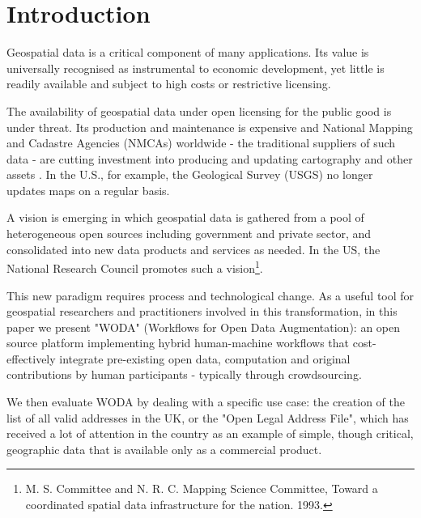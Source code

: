 \section{Introduction}
\label{introduction}

Geospatial data is a critical component of many applications. Its value is universally recognised as instrumental to economic development, yet little is readily available and subject to high costs or restrictive licensing. 

The availability of geospatial data under open licensing for the public good is under threat. Its production and maintenance is expensive and National Mapping and Cadastre Agencies (NMCAs) worldwide - the traditional suppliers of such data - are cutting investment into producing and updating cartography and other assets \cite{ESTES:1994vz}. In the U.S., for example, the Geological Survey (USGS) no longer updates maps on a regular basis. 

A vision is emerging in which geospatial data is gathered from a pool of heterogeneous open sources including government and private sector, and consolidated into new data products and services as needed. In the US, the National Research Council promotes such a vision\footnote{M. S. Committee and N. R. C. Mapping Science Committee, Toward a coordinated spatial data infrastructure for the nation. 1993.}.

This new paradigm requires process and technological change. As a useful tool for geospatial researchers and practitioners involved in this transformation, in this paper we present "WODA" (Workflows for Open Data Augmentation): an open source platform implementing hybrid human-machine workflows that cost-effectively integrate pre-existing open data, computation and original contributions by human participants - typically through crowdsourcing. 

We then evaluate WODA by dealing with a specific use case: the creation of the list of all valid addresses in the UK, or the "Open Legal Address File", which has received a lot of attention in the country as an example of simple, though critical, geographic data that is available only as a commercial product.

